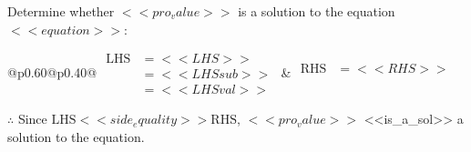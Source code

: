 \noindent{(\theminipagecount)}\hspace{0.1mm} %
\begin{minipage}[t]{0.40\textwidth} %

    \noindent Determine whether \(<<pro_value>>\) is a solution to the equation \(<<equation>>\):
    \vspace{4pt}  %

    \noindent

    \renewcommand{\arraystretch}{1.3} %
    \begin{tabular}{@{}p{0.60\linewidth}@{}p{0.40\linewidth}@{}}
        \(\begin{aligned}
            \text{LHS} &= <<LHS>> \\
                    &= <<LHSsub>> \\
                    &= <<LHSval>>
        \end{aligned}\) &
        \(\begin{aligned}
            \text{RHS} &= <<RHS>>\\
                    & \\
                    &
        \end{aligned}\)
    \end{tabular}
    \renewcommand{\arraystretch}{1.0} %
    \vspace{2pt}  %

    \noindent \(\therefore\) Since \(\text{LHS} <<side_equality>> \text{RHS}\), \(<<pro_value>>\) <<is_a_sol>> a solution to the equation.

\end{minipage}

 \vspace*{16pt}
